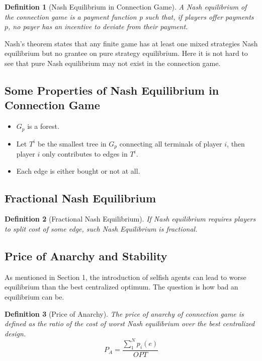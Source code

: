 \documentclass[11pt,psfig,times]{article}
\newtheorem{definition}{Definition}[section]
\begin{document}
\begin{definition}[Nash Equilibrium in Connection Game]
	A Nash equilibrium of the connection game is a payment function p such that, if players offer payments \(p\), no payer has an incentive to deviate from their payment. 
\end{definition}

Nash's theorem states that any finite game has at least one mixed strategies Nash equilibrium but no grantee on pure strategy equilibrium. Here it is not hard to see that pure Nash equilibrium may not exist in the connection game. 
 

\subsection{Some Properties of Nash Equilibrium in Connection Game}

\begin{itemize}
	\item \(G_p\) is a forest.
	\item Let \(T^i\) be the smallest tree in \(G_p\) connecting all terminals of player \(i\), then player \(i\) only contributes to edges in \(T^i\).
	\item Each edge is either bought or not at all. 
\end{itemize}

\subsection{Fractional Nash Equilibrium}
\begin{definition}[Fractional Nash Equilibrium]If Nash equilibrium requires players to split cost of some edge, such Nash Equilibrium is fractional.	
\end{definition}


\subsection{Price of Anarchy and Stability}
As mentioned in Section 1, the introduction of selfish agents can lead to worse equilibrium than the best centralized optimum. The question is how bad an equilibrium can be.
\begin{definition}[Price of Anarchy] The price of anarchy of connection game is defined as the ratio of the cost of worst Nash equilibrium over the best centralized design.
	\[P_A = \dfrac{\sum_{1}^{N}p_i(e) }{OPT}\]
\end{definition}
\end{document}
